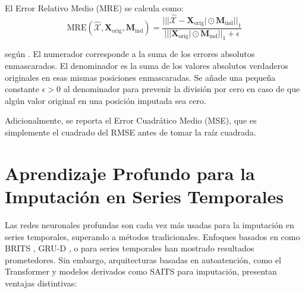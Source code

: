 \begin{definition}
\label{def:mre_hadamard}
El Error Relativo Medio (MRE) se calcula como:
\begin{equation}
\text{MRE}(\hat{\mathcal{X}}, \mathbf{X}_{\text{orig}}, \mathbf{M}_{\text{ind}}) = \frac{||\lvert \hat{\mathcal{X}} - \mathbf{X}_{\text{orig}} \rvert \odot \mathbf{M}_{\text{ind}}||_1}{||\lvert \mathbf{X}_{\text{orig}} \rvert \odot \mathbf{M}_{\text{ind}}||_1 + \epsilon}
\label{eq:mre_hadamard}
\end{equation}

según \citep{Chai2014rmse}.
El numerador corresponde a la suma de los errores absolutos enmascarados. El denominador es la suma de los valores absolutos verdaderos originales en esas mismas posiciones enmascaradas. Se añade una pequeña constante $\epsilon > 0$ al denominador para prevenir la división por cero en caso de que algún valor original en una posición imputada sea cero.
\end{definition}
Adicionalmente, se reporta el Error Cuadrático Medio (MSE), que es simplemente el cuadrado del RMSE antes de tomar la raíz cuadrada.


\section{Aprendizaje Profundo para la Imputación en Series Temporales}
\label{subsubsec:ventajas_saits_sintetizado}

Las redes neuronales profundas son cada vez más usadas para la imputación en series temporales, superando a métodos tradicionales. Enfoques basados en  como BRITS \citep{Cao2018brits}, GRU-D \citep{Che2018recurrent}, o  para series temporales \citep{Luo2018multivariate_e2gan} han mostrado resultados prometedores. Sin embargo, arquitecturas basadas en autoatención, como el Transformer \citep{Vaswani2017} y modelos derivados como SAITS \citep{Du2023SAITS} para imputación, presentan ventajas distintivas:

